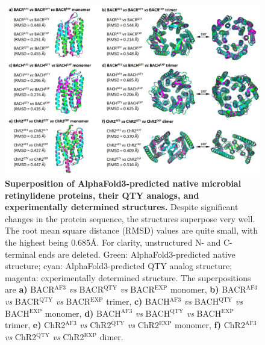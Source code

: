 \documentclass[fleqn, 10pt]{manuscript}
\begin{document}
\begin{figure}[htbp]
	\centering
	\includegraphics[width=\linewidth]{Figures/superposition-microbial.jpg}
	\caption{\textbf{Superposition of AlphaFold3-predicted native microbial retinylidene proteins, their QTY analogs, and experimentally determined structures. } Despite significant changes in the protein sequence, the structures superpose very well. The root mean square distance (RMSD) values are quite small, with the highest being 0.685\AA. For clarity, unstructured N- and C- terminal ends are deleted. 
    Green: AlphaFold3-predicted native structure; cyan: AlphaFold3-predicted QTY analog structure; magenta: experimentally determined structure. 
    The superpositions are 
    \textbf{a)} BACR$^{\textrm{AF3}}$ \textit{vs} BACR$^{\textrm{QTY}}$ \textit{vs} BACR$^{\textrm{EXP}}$ monomer, 
    \textbf{b)} BACR$^{\textrm{AF3}}$ \textit{vs} BACR$^{\textrm{QTY}}$ \textit{vs} BACR$^{\textrm{EXP}}$ trimer, 
    \textbf{c)} BACH$^{\textrm{AF3}}$ \textit{vs} BACH$^{\textrm{QTY}}$ \textit{vs} BACH$^{\textrm{EXP}}$ monomer, 
    \textbf{d)} BACH$^{\textrm{AF3}}$ \textit{vs} BACH$^{\textrm{QTY}}$ \textit{vs} BACH$^{\textrm{EXP}}$ trimer, 
    \textbf{e)} ChR2$^{\textrm{AF3}}$ \textit{vs} ChR2$^{\textrm{QTY}}$ \textit{vs} ChR2$^{\textrm{EXP}}$ monomer, 
    \textbf{f)} ChR2$^{\textrm{AF3}}$ \textit{vs} ChR2$^{\textrm{QTY}}$ \textit{vs} ChR2$^{\textrm{EXP}}$ dimer. }
	\label{fig:microbialsup}
\end{figure}
\end{document}
